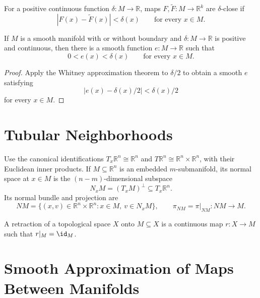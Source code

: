 \begin{definition}
\label{def:6-41-extra-1}
\leanok
For a positive continuous function $\delta:M\to\mathbb{R}$, maps $F,\widetilde F:M\to\mathbb{R}^k$ are $\delta$-close if
\[
|F(x)-\widetilde F(x)|<\delta(x)
\qquad\text{for every }x\in M.
\]
\end{definition}

\begin{corollary}
\label{cor:6-22}
\leanok
{}
If $M$ is a smooth manifold with or without boundary and $\delta:M\to\mathbb{R}$ is positive and continuous, then there is a smooth function $e:M\to\mathbb{R}$ such that
\[
0<e(x)<\delta(x)
\qquad\text{for every }x\in M.
\]
\end{corollary}

\begin{proof}
\leanok
\sketch Apply the Whitney approximation theorem to $\delta/2$ to obtain a smooth $e$ satisfying
\[
|e(x)-\delta(x)/2|<\delta(x)/2
\]
for every $x\in M$.
\end{proof}


\section{Tubular Neighborhoods}

\begin{definition}
\label{def:6-42-extra-1}
\leanok
Use the canonical identifications $T_x\mathbb{R}^n\cong\mathbb{R}^n$ and $T\mathbb{R}^n\cong\mathbb{R}^n\times\mathbb{R}^n$, with their Euclidean inner products. If $M\subseteq\mathbb{R}^n$ is an embedded $m$-submanifold, its normal space at $x\in M$ is the $(n-m)$-dimensional subspace
\[
N_xM=(T_xM)^\perp\subseteq T_x\mathbb{R}^n.
\]
Its normal bundle and projection are
\[
NM=\{(x,v)\in\mathbb{R}^n\times\mathbb{R}^n:x\in M,\ v\in N_xM\},
\qquad
\pi_{NM}=\pi|_{NM}:NM\to M.
\]
\end{definition}

\begin{definition}
\label{def:6-42-extra-3}
\leanok
A retraction of a topological space $X$ onto $M\subseteq X$ is a continuous map $r:X\to M$ such that $r|_M=\id_M$.
\end{definition}


\section{Smooth Approximation of Maps Between Manifolds}

